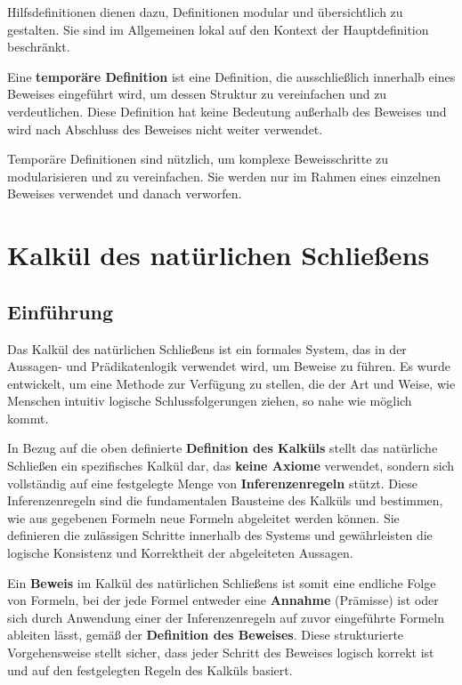 \documentclass[main.tex]{subfiles}
\begin{document}
\begin{remark}
Hilfsdefinitionen dienen dazu, Definitionen modular und übersichtlich zu gestalten. Sie sind im Allgemeinen lokal auf den Kontext der Hauptdefinition beschränkt.
\end{remark}

\begin{definition}
Eine \textbf{temporäre Definition} ist eine Definition, die ausschließlich innerhalb eines Beweises eingeführt wird, um dessen Struktur zu vereinfachen und zu verdeutlichen. Diese Definition hat keine Bedeutung außerhalb des Beweises und wird nach Abschluss des Beweises nicht weiter verwendet.
\end{definition}

\begin{remark}
Temporäre Definitionen sind nützlich, um komplexe Beweisschritte zu modularisieren und zu vereinfachen. Sie werden nur im Rahmen eines einzelnen Beweises verwendet und danach verworfen.
\end{remark}

\section{Kalkül des natürlichen Schließens}

\subsection{Einführung}
Das Kalkül des natürlichen Schließens ist ein formales System, das in der Aussagen- und Prädikatenlogik verwendet wird, um Beweise zu führen. Es wurde entwickelt, um eine Methode zur Verfügung zu stellen, die der Art und Weise, wie Menschen intuitiv logische Schlussfolgerungen ziehen, so nahe wie möglich kommt.

In Bezug auf die oben definierte \textbf{Definition des Kalküls} stellt das natürliche Schließen ein spezifisches Kalkül dar, das \textbf{keine Axiome} verwendet, sondern sich vollständig auf eine festgelegte Menge von \textbf{Inferenzenregeln} stützt. Diese Inferenzenregeln sind die fundamentalen Bausteine des Kalküls und bestimmen, wie aus gegebenen Formeln neue Formeln abgeleitet werden können. Sie definieren die zulässigen Schritte innerhalb des Systems und gewährleisten die logische Konsistenz und Korrektheit der abgeleiteten Aussagen.

Ein \textbf{Beweis} im Kalkül des natürlichen Schließens ist somit eine endliche Folge von Formeln, bei der jede Formel entweder eine \textbf{Annahme} (Prämisse) ist oder sich durch Anwendung einer der Inferenzenregeln auf zuvor eingeführte Formeln ableiten lässt, gemäß der \textbf{Definition des Beweises}. Diese strukturierte Vorgehensweise stellt sicher, dass jeder Schritt des Beweises logisch korrekt ist und auf den festgelegten Regeln des Kalküls basiert.
\end{document}
